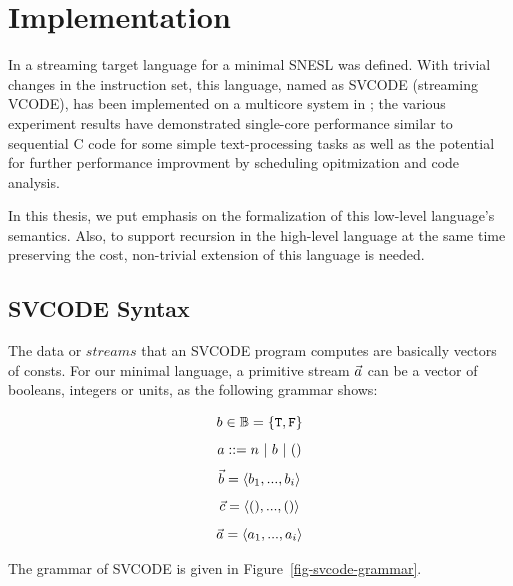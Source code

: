 \clearpage

\def\PRName#1{\textsc{Pre-#1}}

\section{Implementation}

In \cite{Fmaster} a streaming target language for a minimal SNESL was defined.
With trivial changes in the instruction set, this language, named as SVCODE (streaming VCODE), has been implemented on a multicore system in \cite{Fphd}; the various experiment results
have demonstrated single-core performance similar to sequential C code for some simple 
text-processing tasks as well as the
potential for further performance improvment by scheduling opitmization and code analysis.

In this thesis, we put emphasis on the formalization of this low-level language's semantics.
Also, to support recursion in the high-level language at the same time preserving the cost, non-trivial extension of this language is needed. 


\subsection{SVCODE Syntax}
The data or $streams$ that an SVCODE program computes are basically vectors of consts. 
For our minimal language, a primitive stream $\vec a$ can be a vector of booleans, integers or units, as the following grammar shows:

$$b \in \mathbb{B} = \{\mathtt{T},\mathtt{F} \}$$
$$ a ::= n \ | \ b \ | \ ()$$
$$\vec b = \langle b_1,...,b_i \rangle$$ 
$$\vec c = \langle (),...,() \rangle $$
$$\vec a = \langle a_1,...,a_i \rangle  $$ 

\hspace{1cm}

The grammar of SVCODE is given in Figure~\ref{fig-svcode-grammar}.


